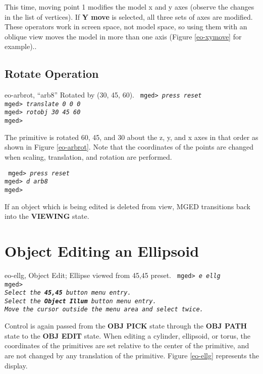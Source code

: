    This time, moving point 1 modifies the model x and y axes (observe the
changes in the list of vertices).  If {\bf Y move} is selected, all
three sets of axes are modified.  These operators work in screen space,
not model space, so using them with an oblique view moves the model in
more than one axis (Figure \ref{eo-xymove} for example)..


\subsection{Rotate Operation}

\mfig eo-arbrot, ``arb8'' Rotated by (30, 45, 60).
\noindent
{\tt
mged> {\em press reset}\\
mged> {\em translate 0 0 0}\\
mged> {\em rotobj 30 45 60}\\
mged>\\
}

The primitive is rotated 60, 45, and 30 about the z, y, and x axes in
that order as shown in Figure \ref{eo-arbrot}.
Note that the coordinates of the points are changed when scaling,
translation, and rotation are performed.

\noindent
{\tt
mged> {\em press reset}\\
mged> {\em d arb8}\\
mged>\\
}

If an object which is being edited is deleted from view, MGED transitions
back into the {\bf VIEWING} state.

\section{Object Editing an Ellipsoid}

\mfig eo-ellg, Object Edit; Ellipse viewed from 45,45 preset.
\noindent
{\tt
mged> {\em e ellg}\\
mged>\\
{\em Select the {\bf 45,45} button menu entry.}\\
{\em Select the {\bf Object Illum} button menu entry.}\\
{\em Move the cursor outside the menu area and select twice.}\\
}

Control is again passed from the {\bf OBJ PICK} state through the
{\bf OBJ PATH} state to the {\bf OBJ EDIT} state.
When editing a cylinder, ellipsoid, or torus, the coordinates of the
primitives are set relative to the center of the primitive, and are not
changed by any translation of the primitive.  Figure \ref{eo-ellg}
represents the display.

